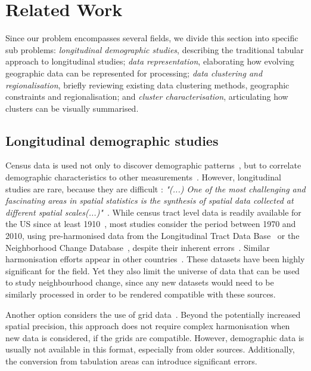 \section{Related Work}
\label{sec:related}

Since our problem encompasses several fields, we divide this section into
specific sub problems: \emph{longitudinal demographic studies}, describing the
traditional tabular approach to longitudinal studies; \emph{data
representation}, elaborating how evolving geographic data can be represented for
processing; \emph{data clustering and regionalisation}, briefly reviewing
existing data clustering methods, geographic constraints and
regionalisation; and \emph{cluster characterisation}, articulating how clusters
can be visually summarised.

\subsection{Longitudinal demographic studies}
Census data is used not only to discover demographic
patterns~\citep{Firebaugh2016}, but to correlate demographic characteristics to
other measurements~\citep{diez1997neighborhood}. However, longitudinal studies
are rare, because they are difficult : \emph{"(...) One of the most challenging
and fascinating areas in spatial statistics is the synthesis of spatial data
collected at different spatial scales(...)"}~\citep{gotway2002combining}. While
census tract level data is readily available for the US since at least
1910~\citep{nhgis}, most studies consider the period between 1970 and 2010,
using pre-harmonised data from the Longitudinal Tract Data
Base~\citep{Logan2014} or the Neighborhood Change Database~\citep{ncdb}, despite
their inherent errors~\citep{Logan2016,Hallisey2017}. Similar harmonisation
efforts appear in other countries~\citep{Liu2015,Lee2015,Allen2018}. These
datasets have been highly significant for the field. Yet they also limit the
universe of data that can be used to study neighbourhood change, since any new
datasets would need to be similarly processed in order to be rendered compatible
with these sources. 

Another option considers the use of grid
data~\citep{Dmowska2017,Dmowska2018,stepinski2019imperfect}. Beyond the
potentially increased spatial precision, this approach does not require complex
harmonisation when new data is considered, if the grids are compatible. However,
demographic data is usually not available in this format, especially from older
sources. Additionally, the conversion from tabulation areas can introduce
significant errors.

